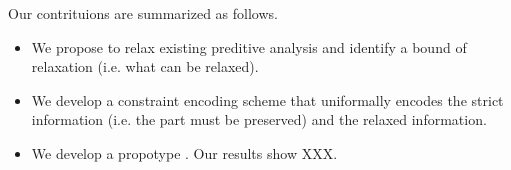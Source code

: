 Our contrituions are summarized as follows.
\begin{itemize}
\item We propose to relax existing preditive analysis and identify a bound of relaxation (i.e. what can
be relaxed).
\item We develop a constraint encoding scheme that uniformally encodes the strict information (i.e. the
part must be preserved) and the relaxed information. 
\item We develop a propotype \sysname. Our results show XXX.
\end{itemize}








